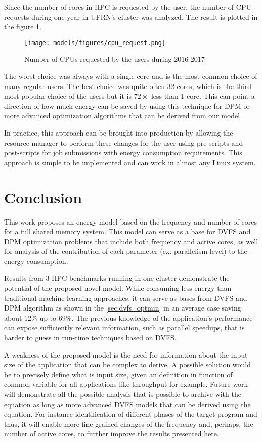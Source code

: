 Since the number of cores in HPC is requested by the user, the number of CPU requests during one year in UFRN's cluster was analyzed. The result is plotted in the figure \ref{fig:cpu_requests}.
\begin{figure}[H]
	\centering
	\texttt{[image: models/figures/cpu\_request.png]}
	\caption{Number of CPUs requested by the users during 2016-2017}
	\label{fig:cpu_requests}
\end{figure}

The worst choice was always with a single core and is the most common choice of many regular users. The best choice was quite often 32 cores, which is the third most popular choice of the users but it is $72\times$ less than 1 core. This can point a direction of how much energy can be saved by using this technique for DPM or more advanced optimization algorithms that can be derived from our model.

In practice, this approach can be brought into production by allowing the resource manager to perform these changes for the user using pre-scripts and post-scripts for job submissions with energy consumption requirements. This approach is simple to be implemented and can work in almost any Linux system.


\section{Conclusion} \label{sec:conclusion}
This work proposes an energy model based on the frequency and number of cores for a full shared memory system. This model can serve as a base for DVFS and DPM optimization problems that include both frequency and active cores, as well for analysis of the contribution of each parameter (ex: parallelism level) to the energy consumption.

Results from 3 HPC benchmarks running in one cluster demonstrate the potential of the proposed novel model. While consuming less energy than traditional machine learning approaches, it can serve as bases from DVFS and DPM algorithm as shown in the \ref{sec:dvfs_optmin} in an average case saving about 12\% up to 69\%. The previous knowledge of the application's performance can expose sufficiently relevant information, such as parallel speedups, that is harder to guess in run-time techniques based on DVFS.

A weakness of the proposed model is the need for information about the input size of the application that can be complex to derive. A possible solution would be to precisely define what is input size, given an definition in function of common variable for all applications like throughput for example. Future work will demonstrate all the possible analysis that is possible to archive with the equation as long as more advanced DVFS models that can be derived using the equation. For instance identification of different phases of the target program and thus, it will enable more fine-grained changes of the frequency and, perhaps, the number of active cores, to further improve the results presented here.


